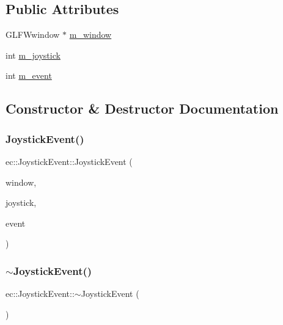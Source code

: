 \subsection*{Public Attributes}
\begin{DoxyCompactItemize}
\item 
G\+L\+F\+Wwindow $\ast$ \mbox{\hyperlink{structec_1_1_joystick_event_a9b108de0a7db9268dd11642a203ef816}{m\+\_\+window}}
\item 
int \mbox{\hyperlink{structec_1_1_joystick_event_a415b6d2d801b41db8f3dee6b2be35448}{m\+\_\+joystick}}
\item 
int \mbox{\hyperlink{structec_1_1_joystick_event_acf4361edcb473cbf0567137224c86f2a}{m\+\_\+event}}
\end{DoxyCompactItemize}


\subsection{Constructor \& Destructor Documentation}
\mbox{\label{structec_1_1_joystick_event_ac922516c15cb953f16fe666a796ab26e}} 
\subsubsection{\texorpdfstring{Joystick\+Event()}{JoystickEvent()}}
{\footnotesize\ttfamily ec\+::\+Joystick\+Event\+::\+Joystick\+Event (\begin{DoxyParamCaption}\item[{G\+L\+F\+Wwindow $\ast$}]{window,  }\item[{const int}]{joystick,  }\item[{const int}]{event }\end{DoxyParamCaption})}

\mbox{\label{structec_1_1_joystick_event_a182ea7dcfcd2e363909eb8ea63a41df8}} 
\subsubsection{\texorpdfstring{$\sim$\+Joystick\+Event()}{~JoystickEvent()}}
{\footnotesize\ttfamily ec\+::\+Joystick\+Event\+::$\sim$\+Joystick\+Event (\begin{DoxyParamCaption}{ }\end{DoxyParamCaption})}



